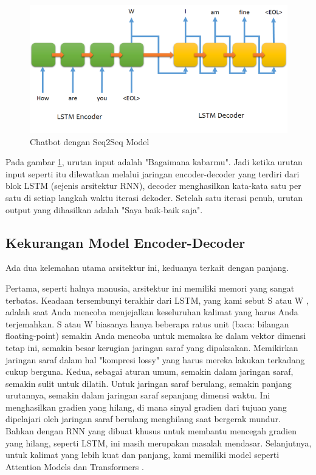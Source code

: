 \begin{figure}[H]
        \centerline{\includegraphics[scale=.65]{figures/chatbot}}
        \caption{Chatbot dengan Seq2Seq Model}
		\label{chatbot}
\end{figure}

Pada gambar \ref{chatbot}, urutan input adalah "Bagaimana kabarmu". Jadi ketika urutan input seperti itu dilewatkan melalui jaringan encoder-decoder yang terdiri dari blok LSTM (sejenis arsitektur RNN), decoder menghasilkan kata-kata satu per satu di setiap langkah waktu iterasi dekoder. Setelah satu iterasi penuh, urutan output yang dihasilkan adalah "Saya baik-baik saja".

\subsection{Kekurangan Model Encoder-Decoder}
Ada dua kelemahan utama arsitektur ini, keduanya terkait dengan panjang.

Pertama, seperti halnya manusia, arsitektur ini memiliki memori yang sangat terbatas. Keadaan tersembunyi terakhir dari LSTM, yang kami sebut S atau W , adalah saat Anda mencoba menjejalkan keseluruhan kalimat yang harus Anda terjemahkan. S atau W biasanya hanya beberapa ratus unit (baca: bilangan floating-point)  semakin Anda mencoba untuk memaksa ke dalam vektor dimensi tetap ini, semakin besar kerugian jaringan saraf yang dipaksakan. Memikirkan jaringan saraf dalam hal "kompresi lossy" yang harus mereka lakukan terkadang cukup berguna.
Kedua, sebagai aturan umum, semakin dalam jaringan saraf, semakin sulit untuk dilatih. Untuk jaringan saraf berulang, semakin panjang urutannya, semakin dalam jaringan saraf sepanjang dimensi waktu. Ini menghasilkan gradien yang hilang, di mana sinyal gradien dari tujuan yang dipelajari oleh jaringan saraf berulang menghilang saat bergerak mundur. Bahkan dengan RNN yang dibuat khusus untuk membantu mencegah gradien yang hilang, seperti LSTM, ini masih merupakan masalah mendasar.
Selanjutnya, untuk kalimat yang lebih kuat dan panjang, kami memiliki model seperti Attention Models dan Transformers . 

